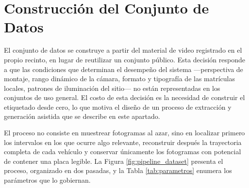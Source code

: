 \section{Construcción del Conjunto de Datos}

El conjunto de datos se construye a partir del material de video registrado en el
propio recinto, en lugar de reutilizar un conjunto público. Esta decisión responde
a que las condiciones que determinan el desempeño del sistema ---perspectiva de
montaje, rango dinámico de la cámara, formato y tipografía de las matrículas
locales, patrones de iluminación del sitio--- no están representadas en los
conjuntos de uso general. El costo de esta decisión es la necesidad de construir
el etiquetado desde cero, lo que motiva el diseño de un proceso de extracción y
generación asistida que se describe en este apartado.

El proceso no consiste en muestrear fotogramas al azar, sino en localizar
primero los intervalos en los que ocurre algo relevante, reconstruir después la
trayectoria completa de cada vehículo y conservar únicamente los fotogramas con
potencial de contener una placa legible. La Figura \ref{fig:pipeline_dataset}
presenta el proceso, organizado en dos pasadas, y la Tabla \ref{tab:parametros}
enumera los parámetros que lo gobiernan.

